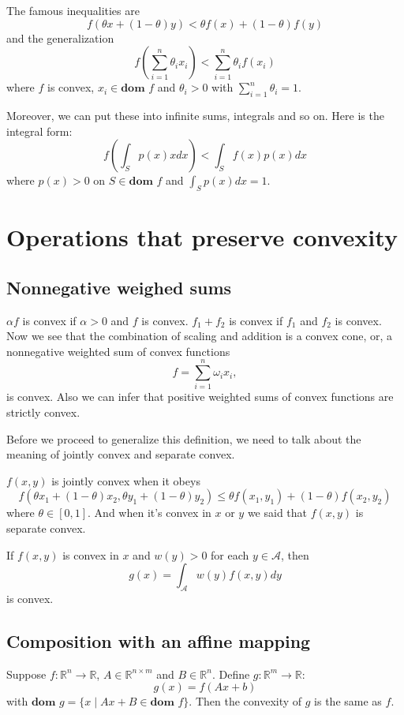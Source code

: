 \documentclass[lang=en,color=blue,mode=fancy,titlestyle=hang]{elegantbook}
\begin{document}
The famous inequalities are
\[
f(\theta x + (1 - \theta) y) < \theta f(x) + (1 - \theta) f(y)
\]
and the generalization
\[
f(\sum_{i = 1}^n \theta_i x_i) < \sum_{i = 1}^n \theta_i f(x_i)
\]
where $f$ is convex, $x_i \in \textbf{dom } f$ and $\theta_i > 0$ with $\sum_{i = 1}^n \theta_i = 1$.

Moreover, we can put these into infinite sums, integrals and so on. Here is the integral
form:
\[
f(\int_S p(x)x dx) < \int_S f(x)p(x) dx
\]
where $p(x) > 0$ on $S \in \textbf{dom } f$ and $\int_S p(x) dx = 1$.

\section{Operations that preserve convexity}
\subsection{Nonnegative weighed sums}

$\alpha f$ is convex if $\alpha > 0 $ and $f$ is convex. $f_1 + f_2$ is convex if $f_1$
and $f_2$ is convex. Now we see that the combination of scaling and addition is a convex
cone, or, a nonnegative weighted sum of convex functions
\[
f = \sum_{i = 1}^n \omega_i x_i,
\]
is convex. Also we can infer that positive weighted sums of convex functions are strictly
convex.

Before we proceed to generalize this definition, we need to talk about the meaning of
jointly convex and separate convex.

$f(x, y)$ is jointly convex when it obeys
\[
f(\theta x_1 + (1 - \theta) x_2, \theta y_1 + (1 - \theta) y_2) \leq \theta f(x_1, y_1) + (1 - \theta) f(x_2, y_2)
\]
where $\theta \in [0, 1]$. And when it's convex in $x$ or $y$ we said that $f(x, y)$ is
separate convex.

If $f(x, y)$ is convex in $x$ and $w(y) > 0$ for each $y \in \mathcal{A}$, then
\[
g(x) = \int_{\mathcal{A}} w(y) f(x, y) dy
\]
is convex.

\subsection{Composition with an affine mapping}

Suppose $f: \mathbb{R}^n \rightarrow \mathbb{R}$, $A \in \mathbb{R}^{n \times m}$ and
$B \in \mathbb{R}^n$. Define $g: \mathbb{R}^m \rightarrow \mathbb{R}$:
\[
g(x) = f(A x + b)
\]
with $\textbf{dom } g = \{x \;|\; A x + B \in \textbf{dom } f\}$. Then the convexity of
$g$ is the same as $f$.
\end{document}

